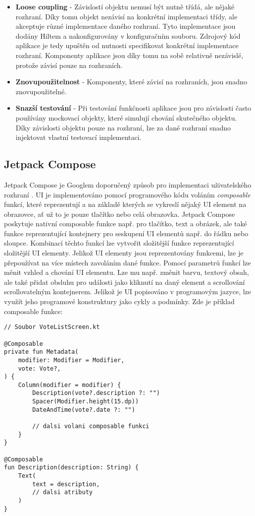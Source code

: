 \begin{itemize}
	\item \textbf{Loose coupling} - Závislostí objektu nemusí být nutně třídá, ale nějaké rozhraní. Díky tomu objekt nezávisí na konkrétní implementaci třídy, ale akceptuje různé implementace daného rozhraní. Tyto implementace jsou dodány Hiltem a nakonfigurovány v konfiguračním souboru. Zdrojový kód aplikace je tedy upuštěn od nutnosti specifikovat konkrétní implementace rozhraní. Komponenty aplikace jsou díky tomu na sobě relativně nezávislé, protože závisí pouze na rozhraních. 
	
	\item \textbf{Znovupoužitelnost} - Komponenty, které závisí na rozhraních, jsou snadno znovupoužitelné.
	
	\item \textbf{Snazší testování} - Při testování funkčnosti aplikace jsou pro závislosti často používány mockovací objekty, které simulují chování skutečného objektu. Díky závislosti objektu pouze na rozhraní, lze za dané rozhraní snadno injektovat vlastní testovací implementaci. 
\end{itemize}

\subsection*{Jetpack Compose}
\label{ssec:jetpack-compose}
Jetpack Compose je Googlem doporučený způsob pro implementaci uživatelského rozhraní \cite{jetpack-compose}. UI je implementováno pomocí programového kódu voláním \textit{composable} funkcí, které reprezentují a na základě kterých se vykreslí nějaký UI element na obrazovce, ať už to je pouze tlačítko nebo celá obrazovka. Jetpack Compose poskytuje nativní composable funkce např. pro tlačítko, text a obrázek, ale také funkce reprezentující kontejnery pro seskupení UI elementů např. do řádku nebo sloupce. Kombinací těchto funkcí lze vytvořit složitější funkce reprezentující složitější UI elementy. Jelikož UI elementy jsou reprezentovány funkcemi, lze je přepoužívat na více místech zavoláním dané funkce. Pomocí parametrů funkcí lze měnit vzhled a chování UI elementu. Lze mu např. změnit barvu, textový obsah, ale také přidat obsluhu pro události jako kliknutí na daný element a scrollování scrollovatelným kontejnerem. Jelikož je UI popisováno v programovým jazyce, lze využít jeho programové konstruktury jako cykly a podmínky. Zde je příklad composable funkce:

\begin{lstlisting}[caption={Ukázka composable funkce}, label={lst:composable-example}, tabsize=2]
// Soubor VoteListScreen.kt

@Composable
private fun Metadata(
	modifier: Modifier = Modifier,
	vote: Vote?,
) {
	Column(modifier = modifier) {
		Description(vote?.description ?: "")
		Spacer(Modifier.height(15.dp))
		DateAndTime(vote?.date ?: "")

		// dalsi volani composable funkci
	}
}

@Composable
fun Description(description: String) {
	Text(
		text = description,
		// dalsi atributy
	)
}

\end{lstlisting}

